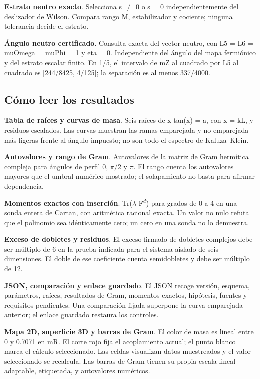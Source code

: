\documentclass[11pt,a4paper]{article}
\begin{document}
\textbf{Estrato neutro exacto}. Selecciona s \ensuremath{\neq} 0 o s = 0 independientemente del deslizador de Wilson. Compara rango M, estabilizador y cociente; ninguna tolerancia decide el estrato.

\textbf{Ángulo neutro certificado}. Consulta exacta del vector neutro, con L5 = L6 = muOmega = muPhi = 1 y eta = 0. Independiente del ángulo del mapa fermiónico y del estrato escalar finito. En 1/5, el intervalo de mZ al cuadrado por L5 al cuadrado es [244/8425, 4/125]; la separación es al menos 337/4000.

\subsection*{Cómo leer los resultados}
\textbf{Tabla de raíces y curvas de masa}. Seis raíces de x tan(x) = a, con x = kL, y residuos escalados. Las curvas muestran las ramas emparejada y no emparejada más ligeras frente al ángulo impuesto; no son todo el espectro de Kaluza--Klein.

\textbf{Autovalores y rango de Gram}. Autovalores de la matriz de Gram hermítica compleja para ángulos de perfil 0, \ensuremath{\pi}/2 y \ensuremath{\pi}. El rango cuenta los autovalores mayores que el umbral numérico mostrado; el solapamiento no basta para afirmar dependencia.

\textbf{Momentos exactos con inserción}. Tr(\ensuremath{\lambda} F\ensuremath{{}^{d}}) para grados de 0 a 4 en una sonda entera de Cartan, con aritmética racional exacta. Un valor no nulo refuta que el polinomio sea idénticamente cero; un cero en una sonda no lo demuestra.

\textbf{Exceso de dobletes y residuos}. El exceso firmado de dobletes complejos debe ser múltiplo de 6 en la prueba indicada para el sistema aislado de seis dimensiones. El doble de ese coeficiente cuenta semidobletes y debe ser múltiplo de 12.

\textbf{JSON, comparación y enlace guardado}. El JSON recoge versión, esquema, parámetros, raíces, resultados de Gram, momentos exactos, hipótesis, fuentes y requisitos pendientes. Una comparación fijada superpone la curva emparejada anterior; el enlace guardado restaura los controles.

\textbf{Mapa 2D, superficie 3D y barras de Gram}. El color de masa es lineal entre 0 y 0.7071 en mR. El corte rojo fija el acoplamiento actual; el punto blanco marca el cálculo seleccionado. Las celdas visualizan datos muestreados y el valor seleccionado se recalcula. Las barras de Gram tienen su propia escala lineal adaptable, etiquetada, y autovalores numéricos.
\end{document}
